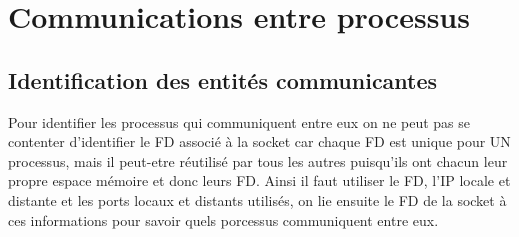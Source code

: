 \documentclass{article}
\begin{document}
\section{Communications entre processus}
\subsection{Identification des entités communicantes}
Pour identifier les processus qui communiquent entre eux on ne peut pas se
contenter d'identifier le FD associé à la socket car chaque FD est unique pour
UN processus, mais il peut-etre réutilisé par tous les autres puisqu'ils ont
chacun leur propre espace mémoire et donc leurs FD. Ainsi il faut utiliser le
FD, l'IP locale et distante et les ports locaux et distants utilisés, on lie
ensuite le FD de la socket à ces informations pour savoir quels porcessus
communiquent entre eux.
\end{document}

